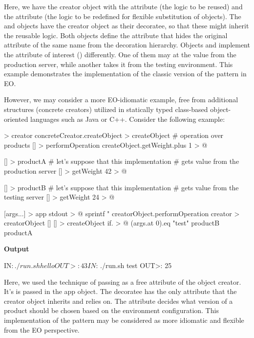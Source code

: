 \documentclass[12pt]{book}
\begin{document}
{{Here, we have the creator object with the  attribute (the logic to be reused) and the  attribute (the logic to be redefined for flexible substitution of objects). The  and  objects have the creator object as their decoratee, so that these might inherit the reusable logic. Both objects define the  attribute that hides the original attribute of the same name from the decoration hierarchy. Objects  and  implement the attribute of interest () differently. One of them may at the value from the production server, while another takes it from the testing environment. This example demonstrates the implementation of the classic version of the pattern in EO. 

However, we may consider a more EO-idiomatic example, free from additional structures (concrete creators) utilized in statically typed class-based object-oriented languages such as Java or C++. Consider the following example: 

\begin{ffcode}
[concreteCreator] > creator
  concreteCreator.createObject > createObject
  # operation over products
  [] > performOperation
    createObject.getWeight.plus 1 > @

[] > productA
  # let's suppose that this implementation
  # gets value from the production server
  [] > getWeight
    42 > @

[] > productB
  # let's suppose that this implementation
  # gets value from the testing server
  [] > getWeight
    24 > @

[args...] > app
  stdout > @
    sprintf
      "%
      creatorObject.performOperation
  creator > creatorObject
    []
      [] > createObject
        if. > @
          (args.at 0).eq "test"
          productB
          productA

\end{ffcode}
\textbf{Output}
\begin{ffcode}
IN$: ./run.sh hello
OUT>: 43
IN$: ./run.sh test
OUT>: 25
\end{ffcode}

Here, we used the technique of passing  as a free attribute of the object creator. It's  is passed in the app object. The decoratee has the only attribute  that the creator object inherits and relies on. The  attribute decides what version of a product should be chosen based on the environment configuration. This implementation of the pattern may be considered as more idiomatic and flexible from the EO perspective.


}}
\end{document}
